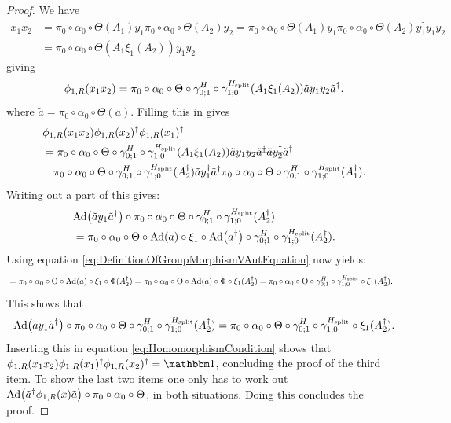 \documentclass[11pt,a4paper,twoside]{article}
\numberwithin{equation}{section}
\begin{document}
\begin{proof}
		We have
		\begin{align}
			x_1x_2&=\pi_0\circ\alpha_0\circ\Theta(A_1)y_1\pi_0\circ\alpha_0\circ\Theta(A_2)y_2=\pi_0\circ\alpha_0\circ\Theta(A_1)y_1\pi_0\circ\alpha_0\circ\Theta(A_2)y_1^{\dagger}y_1y_2\\
			\nonumber
			&=\pi_0\circ\alpha_0\circ\Theta(A_1\xi_1(A_2))y_1y_2
		\end{align}
		giving
		\begin{equation}
			\phi_{1,R}(x_1x_2)=\pi_0\circ\alpha_0\circ\Theta\circ\gamma^H_{0;1}\circ\gamma^{{H_{\text{split}}}}_{1;0}(A_1\xi_1(A_2))\tilde{a}y_1y_2\tilde{a}^\dagger.
		\end{equation}
		where $\tilde{a}=\pi_0\circ\alpha_0\circ\Theta(a)$. Filling this in gives
		\begin{align}
			\nonumber
			&\phi_{1,R}(x_1x_2)\phi_{1,R}(x_2)^\dagger\phi_{1,R}(x_1)^\dagger\\
			\label{eq:HomomorphismCondition}
			&=\pi_0\circ\alpha_0\circ\Theta\circ\gamma^H_{0;1}\circ\gamma^{\Hsplit}_{1;0}(A_1\xi_1(A_2))\tilde{a}y_1\stkout{y_2\tilde{a}^\dagger \tilde{a}y_2^\dagger}\tilde{a}^\dagger\\
			\nonumber
			&\quad\pi_0\circ\alpha_0\circ\Theta\circ\gamma^H_{0;1}\circ\gamma^{\Hsplit}_{1;0}(A_2^\dagger)\tilde{a}y_1^\dagger\tilde{a}^\dagger \pi_0\circ\alpha_0\circ\Theta\circ\gamma^H_{0;1}\circ\gamma^{\Hsplit}_{1;0}(A_1^\dagger).
		\end{align}
		Writing out a part of this gives:
		\begin{align}
			&\Ad{\tilde{a}y_1\tilde{a}^\dagger}\circ\pi_0\circ\alpha_0\circ\Theta\circ\gamma^H_{0;1}\circ\gamma^{\Hsplit}_{1;0}(A_2^\dagger)\\
			\nonumber
			&=\pi_0\circ\alpha_0\circ\Theta\circ\Ad{a}\circ\xi_1\circ\Ad{a^\dagger}\circ\gamma^H_{0;1}\circ\gamma^{\Hsplit}_{1;0}(A_2^\dagger).
		\end{align}
		Using equation \eqref{eq:DefinitionOfGroupMorphismVAutEquation} now yields:
		\begin{align}
			&=\pi_0\circ\alpha_0\circ\Theta\circ\Ad{a}\circ\xi_1\circ\Phi(A_2^\dagger)=\pi_0\circ\alpha_0\circ\Theta\circ\Ad{a}\circ\Phi\circ\xi_1(A_2^\dagger)=\pi_0\circ\alpha_0\circ\Theta\circ\gamma^H_{0;1}\circ\gamma^{\Hsplit}_{1;0}\circ\xi_1(A_2^\dagger).
		\end{align}
		This shows that
		\begin{equation}
			\Ad{\tilde{a}y_1\tilde{a}^\dagger}\circ\pi_0\circ\alpha_0\circ\Theta\circ\gamma^H_{0;1}\circ\gamma^{\Hsplit}_{1;0}(A_2^\dagger)=\pi_0\circ\alpha_0\circ\Theta\circ\gamma^H_{0;1}\circ\gamma^{\Hsplit}_{1;0}\circ\xi_1(A_2^\dagger).
		\end{equation}
		Inserting this in equation \eqref{eq:HomomorphismCondition} shows that $\phi_{1,R}(x_1x_2)\phi_{1,R}(x_1)^\dagger\phi_{1,R}(x_2)^\dagger=\id$, concluding the proof of the third item. To show the last two items one only has to work out $\Ad{\tilde{a}^\dagger \phi_{1,R}(x)\tilde{a}}\circ\pi_0\circ\alpha_0\circ\Theta$, in both situations. Doing this concludes the proof.
	\end{proof}
\end{document}
